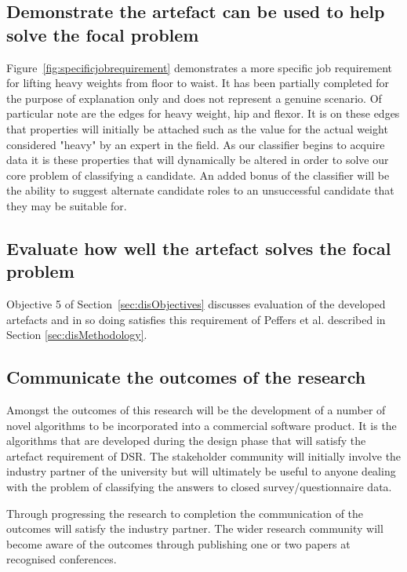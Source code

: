 \subsection{Demonstrate the artefact can be used to help solve the focal problem}

Figure~\ref{fig:specificjobrequirement} demonstrates a more specific job requirement for lifting heavy weights from floor
to waist. It has been partially completed for the purpose of explanation only and does not represent a genuine scenario.
Of particular note are the edges for heavy weight,
hip and flexor. It is on these edges that properties will initially be attached such as the value for the actual weight
considered "heavy" by an expert in the field. As our classifier begins to acquire data it is these properties that will
dynamically be altered in order to solve our core problem of classifying a candidate. An added bonus of the classifier
will be the ability to suggest alternate candidate roles to an unsuccessful candidate that they may be suitable for.




\subsection{Evaluate how well the artefact solves the focal problem}

Objective 5 of Section~\ref{sec:disObjectives} discusses evaluation of the developed artefacts and in so doing satisfies
this requirement of Peffers et al. described in Section \ref{sec:disMethodology}.

\subsection{Communicate the outcomes of the research}


Amongst the outcomes of this research will be the development of a number of novel algorithms to be incorporated into a commercial software product. It is the algorithms that are developed during the design phase that will satisfy the artefact requirement of DSR. The stakeholder community will initially involve the industry partner of the university but will ultimately be useful to anyone dealing with the problem of classifying the answers to closed survey/questionnaire data.
\par
Through progressing the research to completion the communication of the outcomes will satisfy the industry partner. The wider research
community will become aware of the outcomes through publishing one or two papers at recognised conferences.



